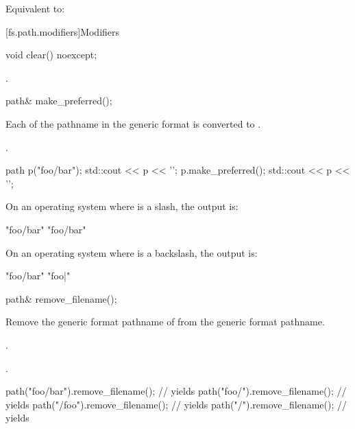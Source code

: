 \begin{itemdescr}
\pnum
\effects
Equivalent to: 
\end{itemdescr}

[fs.path.modifiers]{Modifiers}

%
\begin{itemdecl}
void clear() noexcept;
\end{itemdecl}

\begin{itemdescr}
\pnum
\ensures
{}.
\end{itemdescr}

%
\begin{itemdecl}
path& make_preferred();
\end{itemdecl}

\begin{itemdescr}
\pnum
\effects
Each 
of the pathname in the generic format
  is converted to .

\pnum
\returns
{}.

\pnum
\begin{example}
\begin{codeblock}
path p("foo/bar");
std::cout << p << '\n';
p.make_preferred();
std::cout << p << '\n';
\end{codeblock}
On an operating system where  is a slash,
the output is:
\begin{codeblock}
"foo/bar"
"foo/bar"
\end{codeblock}
On an operating system where  is a backslash, the
output is:
\begin{codeblock}
"foo/bar"
"foo\bar"
\end{codeblock}
\end{example}
\end{itemdescr}

%
\begin{itemdecl}
path& remove_filename();
\end{itemdecl}

\begin{itemdescr}
\pnum
\effects
Remove the generic format pathname of  from the generic format pathname.

\pnum
\ensures
{}.

\pnum
\returns
{}.

\pnum
\begin{example}
\begin{codeblock}
path("foo/bar").remove_filename();      // yields 
path("foo/").remove_filename();         // yields 
path("/foo").remove_filename();         // yields 
path("/").remove_filename();            // yields 
\end{codeblock}
\end{example}
\end{itemdescr}

